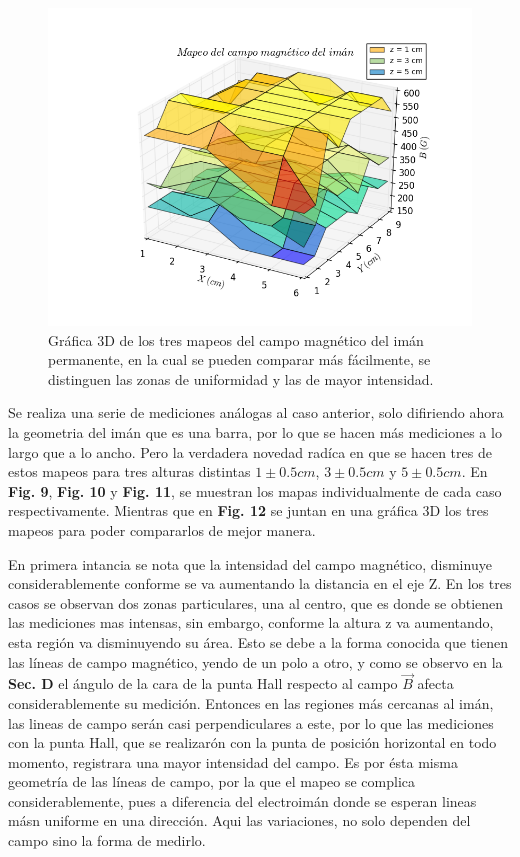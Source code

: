 \documentclass[twocolumn,showpacs,preprintnumbers,amsmath,amssymb]{revtex4-1}
\begin{document}
\begin{figure}
\includegraphics[scale=0.46]{figura_12.png}
\caption{\label{fig:epsart}Gráfica 3D de los tres mapeos del campo magnético del imán permanente, en la cual se pueden comparar
más fácilmente, se distinguen las zonas de uniformidad y las de mayor intensidad.}
\end{figure}

Se realiza una serie de mediciones análogas al caso anterior, solo difiriendo ahora la geometria del imán que es una barra, por
lo que se hacen más mediciones a lo largo que a lo ancho. Pero la verdadera novedad radíca en que se hacen tres de estos mapeos
para tres alturas distintas $1 \pm 0.5 cm$, $3 \pm 0.5 cm$ y $5 \pm 0.5 cm$. En \textbf{Fig. 9}, \textbf{Fig. 10} y \textbf{Fig. 11}, se
muestran los mapas individualmente de cada caso respectivamente. Mientras que en \textbf{Fig. 12} se juntan en una gráfica 3D
los tres mapeos para poder compararlos de mejor manera.

En primera intancia se nota que la intensidad del campo magnético, disminuye considerablemente conforme se va aumentando
la distancia en el eje Z. En los tres casos se observan dos zonas particulares, una al centro, que es donde se obtienen
las mediciones mas intensas, sin embargo, conforme la altura z va aumentando, esta región va disminuyendo su área. Esto se debe
a la forma conocida que tienen las líneas de campo magnético, yendo de un polo a otro, y como se observo en la \textbf{Sec. D}
el ángulo de la cara de la punta Hall respecto al campo $\vec{B}$ afecta considerablemente su medición. Entonces en las regiones más
cercanas al imán, las lineas de campo serán casi perpendiculares a este, por lo que las mediciones con la punta Hall, que se realizarón
con la punta de posición horizontal en todo momento, registrara una mayor intensidad del campo. Es por ésta misma geometría
de las líneas de campo, por la que el mapeo se complica considerablemente, pues a diferencia del electroimán donde se esperan lineas
másn uniforme en una dirección. Aqui las variaciones, no solo dependen del campo sino la forma de medirlo.
\end{document}

